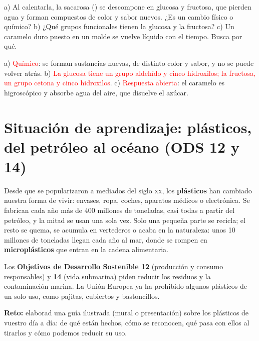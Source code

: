 \begin{exercise}
    a) Al calentarla, la sacarosa () se descompone en glucosa y fructosa, que pierden agua y forman compuestos de color y
    sabor nuevos. ¿Es un cambio físico o químico? b) ¿Qué grupos funcionales tienen la glucosa y la fructosa? c) Un caramelo duro
    puesto en un molde se vuelve líquido con el tiempo. Busca por qué.
    \begin{solu}
        a) \textcolor{red}{Químico}: se forman sustancias nuevas, de distinto color y sabor, y no se puede volver atrás.
        b) \textcolor{red}{La glucosa tiene un grupo aldehído y cinco hidroxilos; la fructosa, un grupo cetona y cinco hidroxilos}.
        c) \textcolor{red}{Respuesta abierta}: el caramelo es higroscópico y absorbe agua del aire, que disuelve el azúcar.
    \end{solu}
\end{exercise}

\section{Situación de aprendizaje: plásticos, del petróleo al océano (ODS 12 y 14)}\label{sec:ud7-ods}

Desde que se popularizaron a mediados del siglo \textsc{xx}, los \textbf{plásticos} han cambiado nuestra forma de vivir: envases,
ropa, coches, aparatos médicos o electrónica. Se fabrican cada año más de 400 millones de toneladas, casi todas a partir del
petróleo, y la mitad se usan una sola vez. Solo una pequeña parte se recicla; el resto se quema, se acumula en vertederos o acaba en
la naturaleza: unos 10 millones de toneladas llegan cada año al mar, donde se rompen en \textbf{microplásticos} que entran en la
cadena alimentaria.

Los \textbf{Objetivos de Desarrollo Sostenible 12} (producción y consumo responsables) y \textbf{14} (vida submarina) piden reducir
los residuos y la contaminación marina. La Unión Europea ya ha prohibido algunos plásticos de un solo uso, como pajitas, cubiertos y
bastoncillos.

\begin{marker}
    \textbf{Reto:} elaborad una guía ilustrada (mural o presentación) sobre los plásticos de vuestro día a día: de qué están hechos,
    cómo se reconocen, qué pasa con ellos al tirarlos y cómo podemos reducir su uso.
\end{marker}

